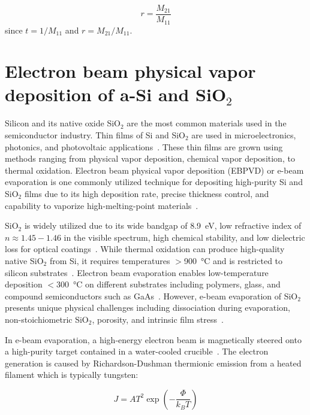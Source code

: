 \begin{equation} \label{eqn: multilayer_reflection_coefficient}
	r = \frac{M_{21}}{M_{11}}
\end{equation}
since $t = 1 / M_{11}$ and $r = M_{21} / M_{11}$.

\section{Electron beam physical vapor deposition of a-Si and SiO\texorpdfstring{$_{2}$}{2}}\label{sec: ebeam_rrl}
Silicon and its native oxide SiO$_2$ are the most common materials used in the semiconductor industry. Thin films of Si and SiO$_2$ are used in microelectronics, photonics, and photovoltaic applications~\cite{reed2PhotolithographicMicrofabrication1998}. These thin films are grown using methods ranging from physical vapor deposition, chemical vapor deposition, to thermal oxidation. Electron beam physical vapor deposition (EBPVD) or e-beam evaporation is one commonly utilized technique for depositing high-purity Si and SiO$_2$ films due to its high deposition rate, precise thickness control, and capability to vaporize high-melting-point materials~\cite{ohanlonGasProperties2003}.

SiO$_2$ is widely utilized due to its wide bandgap of \qty{8.9}{\electronvolt}, low refractive index of $n \approx 1.45 - 1.46$ in the visible spectrum, high chemical stability, and low dielectric loss for optical coatings~\cite{sharmaCeramicbasedNanocompositesPerspective2022}. While thermal oxidation can produce high-quality native SiO$_2$ from Si, it requires temperatures $>$\qty{900}{\celsius} and is restricted to silicon substrates~\cite{bentChapter5Semiconductor2008}. Electron beam evaporation enables low-temperature deposition $<$\qty{300}{\celsius} on different substrates including polymers, glass, and compound semiconductors such as GaAs~\cite{eizenbergElectronBeamEvaporation1986}. However, e-beam evaporation of SiO$_2$ presents unique physical challenges including dissociation during evaporation, non-stoichiometric SiO$_2$, porosity, and intrinsic film stress~\cite{ritterOpticalFilmMaterials1976}.

In e-beam evaporation, a high-energy electron beam is magnetically steered onto a high-purity target contained in a water-cooled crucible~\cite{ohanlonGasProperties2003}. The electron generation is caused by Richardson-Dushman thermionic emission from a heated filament which is typically tungsten:

\begin{equation} \label{eqn: thermionic_emission}
	J = A T^2 \exp\left( -\frac{\Phi}{k_B T} \right)
\end{equation}

